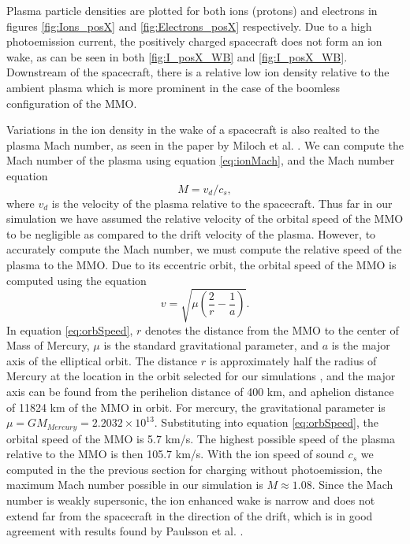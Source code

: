 Plasma particle densities are plotted for both ions (protons) and electrons in figures \ref{fig:Ions_posX} and \ref{fig:Electrons_posX} respectively. Due to a high photoemission current, the positively charged spacecraft does not form an ion wake, as can be seen in both \ref{fig:I_posX_WB} and \ref{fig:I_posX_WB}. Downstream of the spacecraft, there is a relative low ion density relative to the ambient plasma which is more prominent in the case of the boomless configuration of the MMO. 

Variations in the ion density in the wake of a spacecraft is also realted to the plasma Mach number, as seen in the paper by Miloch et al. \parencite{Paulsson2019}. We can compute the Mach number of the plasma using equation \eqref{eq:ionMach}, and the Mach number equation
\begin{equation}
    M = v_d / c_s,
\end{equation}
where $v_d$ is the velocity of the plasma relative to the spacecraft. Thus far in our simulation we have assumed the relative velocity of the orbital speed of the MMO to be negligible as compared to the drift velocity of the plasma. However, to accurately compute the Mach number, we must compute the relative speed of the plasma to the MMO. Due to its eccentric orbit, the orbital speed of the MMO is computed using the equation
\begin{equation}\label{eq:orbSpeed}
    v = \sqrt{\mu \left(\frac{2}{r} - \frac{1}{a}\right)}.
\end{equation}
In equation \eqref{eq:orbSpeed}, $r$ denotes the distance from the MMO to the center of Mass of Mercury, $\mu$ is the standard gravitational parameter, and $a$ is the major axis of the elliptical orbit. The distance $r$ is approximately half the radius of Mercury at the location in the orbit selected for our simulations \parencite{Benna2009}, and the major axis can be found from the perihelion distance of 400 km, and aphelion distance of 11824 km of the MMO in orbit. For mercury, the gravitational parameter is $\mu = G M_{Mercury} = 2.2032 \times 10^{13}$. Substituting into equation \eqref{eq:orbSpeed}, the orbital speed of the MMO is 5.7 km/s. The highest possible speed of the plasma relative to the MMO is then 105.7 km/s. With the ion speed of sound $c_s$ we computed in the the previous section for charging without photoemission, the maximum Mach number possible in our simulation is $M \approx 1.08$. Since the Mach number is weakly supersonic, the ion enhanced wake is narrow and does not extend far from the spacecraft in the direction of the drift, which is in good agreement with results found by Paulsson et al. \parencite{Paulsson2019}.   

